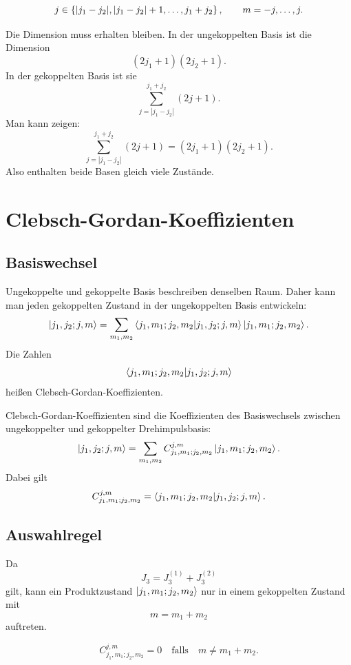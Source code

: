 \begin{formulabox}
\[
    j\in\left\{ |j_1-j_2|,|j_1-j_2|+1,\dots,j_1+j_2 \right\},
    \qquad
    m=-j,\dots,j.
\]
\end{formulabox}

\begin{sidecalcbox}
Die Dimension muss erhalten bleiben. In der ungekoppelten Basis ist die Dimension
\[
    (2j_1+1)(2j_2+1).
\]
In der gekoppelten Basis ist sie
\[
    \sum_{j=|j_1-j_2|}^{j_1+j_2}(2j+1).
\]
Man kann zeigen:
\[
    \sum_{j=|j_1-j_2|}^{j_1+j_2}(2j+1)
    =(2j_1+1)(2j_2+1).
\]
Also enthalten beide Basen gleich viele Zustände.
\end{sidecalcbox}

\section{Clebsch-Gordan-Koeffizienten}

\subsection{Basiswechsel}

Ungekoppelte und gekoppelte Basis beschreiben denselben Raum. Daher kann man jeden gekoppelten Zustand in der ungekoppelten Basis entwickeln:
\[
    \left|j_1,j_2;j,m\right\rangle
    =\sum_{m_1,m_2}
    \left\langle j_1,m_1;j_2,m_2\middle|j_1,j_2;j,m\right\rangle
    \left|j_1,m_1;j_2,m_2\right\rangle.
\]
Die Zahlen
\[
    \left\langle j_1,m_1;j_2,m_2\middle|j_1,j_2;j,m\right\rangle
\]
heißen Clebsch-Gordan-Koeffizienten.

\begin{definitionbox}
Clebsch-Gordan-Koeffizienten sind die Koeffizienten des Basiswechsels zwischen ungekoppelter und gekoppelter Drehimpulsbasis:
\[
    \left|j_1,j_2;j,m\right\rangle
    =\sum_{m_1,m_2} C^{j,m}_{j_1,m_1;j_2,m_2}
    \left|j_1,m_1;j_2,m_2\right\rangle.
\]
Dabei gilt
\[
    C^{j,m}_{j_1,m_1;j_2,m_2}
    =\left\langle j_1,m_1;j_2,m_2\middle|j_1,j_2;j,m\right\rangle.
\]
\end{definitionbox}

\subsection{Auswahlregel}

Da
\[
    J_3=J^{(1)}_3+J^{(2)}_3
\]
gilt, kann ein Produktzustand \(\left|j_1,m_1;j_2,m_2\right\rangle\) nur in einem gekoppelten Zustand mit
\[
    m=m_1+m_2
\]
auftreten.

\begin{formulabox}
\[
    C^{j,m}_{j_1,m_1;j_2,m_2}=0
    \quad \text{falls} \quad
    m\neq m_1+m_2.
\]
\end{formulabox}

